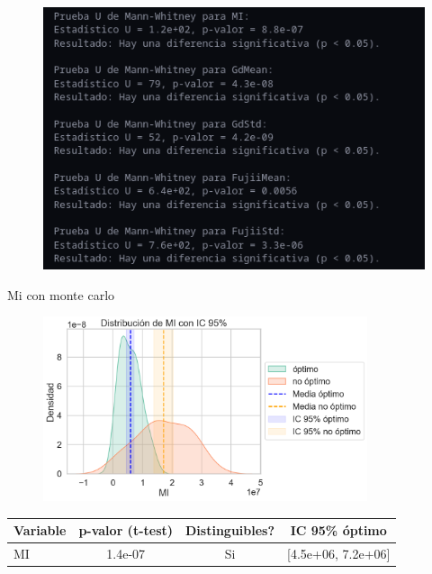 \documentclass{beamer}
\begin{document}
\begin{frame}
    \begin{figure}
        \includegraphics[width=\textwidth]{mcwhitney.png}
    \end{figure}
\end{frame}

\begin{frame}{Mi con monte carlo}
    \begin{table}
        \centering
        \begin{figure}
            \includegraphics[width=0.85\textwidth]{McMi.png}
        \end{figure}
        \begin{tabular}{|l|c|c|c|}
            \hline
            \textbf{Variable} & \textbf{p-valor (t-test)} & \textbf{Distinguibles?} & \textbf{IC 95\% óptimo} \\
            \hline
            MI & 1.4e-07 & Si & [4.5e+06, 7.2e+06] \\
            \hline
        \end{tabular}
    \end{table}
\end{frame}
\end{document}
